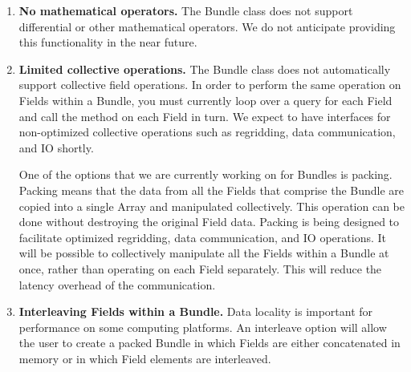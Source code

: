 
\label{sec:bundlerest}

\begin{enumerate}
\item{\bf No mathematical operators.}
The Bundle class does not support differential or other
mathematical operators.  We do not anticipate providing this 
functionality in the near future.

\item{\bf Limited collective operations.}
The Bundle class does not automatically support collective field 
operations.  In order to perform the same operation on Fields within
a Bundle, you must currently loop over a query for each Field and
call the method on each Field in turn.  We expect to have 
interfaces for non-optimized collective operations such as 
regridding, data communication, and IO shortly.

One of the options that we are currently working on for Bundles is
packing.  Packing means that the data from all the
Fields that comprise the Bundle are copied into a single Array and
manipulated collectively.  This operation can be done without 
destroying the original Field data.  Packing is being designed to 
facilitate optimized regridding, data communication, and IO operations.  
It will be possible to collectively manipulate all the Fields within 
a Bundle at once, rather than operating on each Field separately.  
This will reduce the latency overhead of the communication.  

\item{\bf Interleaving Fields within a Bundle.}
Data locality is important for performance on some computing
platforms.  An interleave option will allow the user to create
a packed Bundle in which Fields are either concatenated in memory
or in which Field elements are interleaved.

\end{enumerate}




